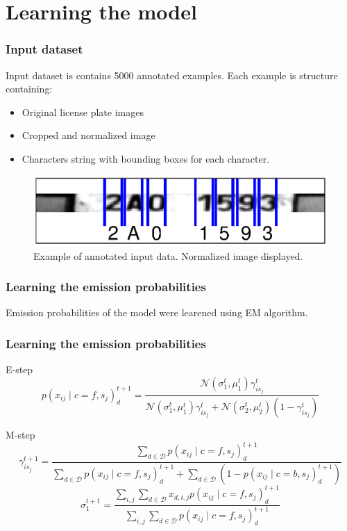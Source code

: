 \documentclass{beamer}
\begin{document}
\section{Learning the model}

\begin{frame}
  \frametitle{Input dataset}
  Input dataset is contains 5000 annotated examples. Each example is structure containing:
\begin{itemize}
  \item Original license plate images
  \item Cropped and normalized image
  \item Characters string with bounding boxes for each character.
\end{itemize}

\begin{figure}
\includegraphics[width=\linewidth]{pics/input_example.eps}
\caption{Example of annotated input data. Normalized image displayed.}
\label{fig:distribution}
\end{figure}

\end{frame}

\begin{frame}
  \frametitle{Learning the emission probabilities}
	Emission probabilities of the model were learened using EM algorithm.
  
\end{frame}

\begin{frame}
  \frametitle{Learning the emission probabilities}
\begin{block}{E-step}
	\[
  p(x_{ij} \mid c=f, s_j)_d^{t+1} = \frac{\mathcal{N}(\sigma_1^t,\mu_1^t)\gamma_{is_j}^t}{\mathcal{N}(\sigma_1^t,\mu_1^t)\gamma_{is_j}^t+\mathcal{N}(\sigma_2^t,\mu_2^t)(1-\gamma_{is_j}^t)}
\]
	\end{block}

\begin{block}{M-step}
\[
  \gamma_{is_j}^{t+1} = \frac{\sum_{d \in \mathcal{D}} p(x_{ij} \mid c=f, s_j)_d^{t+1}}{\sum_{d \in \mathcal{D}} p(x_{ij} \mid c=f, s_j)_d^{t+1} + \sum_{d \in \mathcal{D}} (1-p(x_{ij} \mid c=b, s_j)_d^{t+1})}
\]
\[
  \sigma_1^{t+1} = \frac{\sum_{i,j} \sum_{d \in \mathcal{D}} x_{d, i,j} p(x_{ij} \mid c=f, s_j)_d^{t+1} }{\sum_{i,j} \sum_{d \in \mathcal{D}} p(x_{ij} \mid c=f, s_j)_d^{t+1}}
\]  
\end{block}  
\end{frame}
\end{document}
